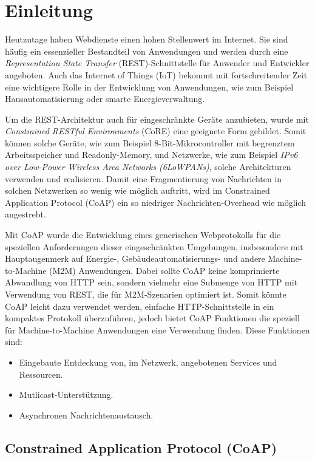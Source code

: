 \section{Einleitung}
\label{sec:einleitung}

Heutzutage haben Webdienste einen hohen Stellenwert im Internet. Sie sind häufig ein essenzieller Bestandteil von Anwendungen und werden durch eine \textit{Representation State Transfer} (REST)-Schnittstelle für Anwender und Entwickler angeboten. Auch das Internet of Things (IoT) bekommt mit fortschreitender Zeit eine wichtigere Rolle in der Entwicklung von Anwendungen, wie zum Beispiel Hausautomatisierung oder smarte Energieverwaltung.

Um die REST-Architektur auch für eingeschränkte Geräte anzubieten, wurde mit \textit{Constrained RESTful Environments} (CoRE) eine geeignete Form gebildet. Somit können solche Geräte, wie zum Beispiel 8-Bit-Mikrocontroller mit begrenztem Arbeitsspeicher und Readonly-Memory, und Netzwerke, wie zum Beispiel \textit{IPv6 over Low-Power Wireless Area Networks (6LoWPANs)}, solche Architekturen verwenden und realisieren. Damit eine Fragmentierung von Nachrichten in solchen Netzwerken so wenig wie möglich auftritt, wird im Constrained Application Protocol (CoAP) ein so niedriger Nachrichten-Overhead wie möglich angestrebt.

Mit CoAP wurde die Entwicklung eines generischen Webprotokolls für die speziellen Anforderungen dieser eingeschränkten Umgebungen, insbesondere mit Hauptaugenmerk auf Energie-, Gebäudeautomatisierungs- und andere Machine-to-Machine (M2M) Anwendungen. Dabei sollte CoAP keine komprimierte Abwandlung von HTTP sein, sondern vielmehr eine Submenge von HTTP mit Verwendung von REST, die für M2M-Szenarien optimiert ist. Somit könnte CoAP leicht dazu verwendet werden, einfache HTTP-Schnittstelle in ein kompaktes Protokoll überzuführen, jedoch bietet CoAP Funktionen die speziell für Machine-to-Machine Anwendungen eine Verwendung finden. Diese Funktionen sind:
\begin{itemize}
    \item Eingebaute Entdeckung von, im Netzwerk, angebotenen Services und Ressourcen.
    \item Mutlicast-Unterstützung.
    \item Asynchronen Nachrichtenaustausch.
\end{itemize}

\subsection{Constrained Application Protocol (CoAP)}
\label{subsec:constrained-application-protocol}

